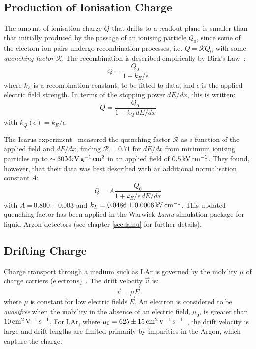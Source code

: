 \subsection{Production of Ionisation Charge}\label{sec:production-ionisation-charge}
The amount of ionisation charge $Q$ that drifts to a readout plane is smaller than that initially produced by the passage of an ionising particle $Q_0$, since some of the electron-ion pairs undergo recombination processes, i.e. $Q = \mathcal{R}Q_0$ with some \emph{quenching factor} $\mathcal{R}$. The recombination is described empirically by Birk's Law~\citep{Birks1964}:
\begin{equation}\label{eqn:birks_law}
    Q = \frac{Q_0}{1 + k_E / \epsilon}
\end{equation}
where $k_E$ is a recombination constant, to be fitted to data, and $\epsilon$ is the applied electric field strength. In terms of the stopping power $dE/dx$, this is written:
\begin{equation}\label{eqn:birks_law_dEdx}
    Q = \frac{Q_0}{1 + k_Q\, dE/dx}
\end{equation}
with $k_Q(\epsilon) = k_E / \epsilon$.

The Icarus experiment~\citep{Amoruso2004} measured the quenching factor $\mathcal{R}$ as a function of the applied field and $dE/dx$, finding $\mathcal{R} = 0.71$ for $dE/dx$ from minimum ionising particles up to $\sim 30 \,\mathrm{MeV} \,\mathrm{g}^{-1} \,\mathrm{cm}^2$ in an applied field of $0.5 \,\mathrm{kV} \,\mathrm{cm}^{-1}$. They found, however, that their data was best described with an additional normalisation constant $A$:
\begin{equation}\label{eqn:icarus_quenching}
Q = A\frac{Q_0}{1 + k_E/\epsilon \, dE/dx}
\end{equation}
with $A=0.800\pm0.003$ and $k_E = 0.0486\pm 0.0006 \,\mathrm{kV} \,\mathrm{cm}^{-1}$. This updated quenching factor has been applied in the Warwick \emph{Lamu} simulation package for liquid Argon detectors (see chapter \ref{sec:lamu} for further details).

\subsection{Drifting Charge}
Charge transport through a medium such as \ac{LAr} is governed by the mobility $\mu$ of charge carriers (electrons)~\citep{Aprile2006}. The drift velocity $\vec{v}$ is:
\begin{equation}\label{eqn:charge_transport}
    \vec{v} = \mu \vec{E}
\end{equation}
where $\mu$ is constant for low electric fields $\vec{E}$. An electron is considered to be \emph{quasifree} when the mobility in the absence of an electric field, $\mu_0$, is greater than $10 \,\mathrm{cm}^2 \,\mathrm{V}^{-1} \,\mathrm{s}^{-1}$. For \ac{LAr}, where $\mu_0 = 625 \pm 15 \,\mathrm{cm}^2 \,\mathrm{V}^{-1} \,\mathrm{s}^{-1}$~\citep{Aprile2006}, the drift velocity is large and drift lengths are limited primarily by impurities in the Argon, which capture the charge.

